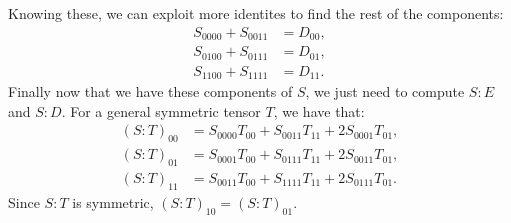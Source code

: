 \documentclass{article}
\begin{document}
Knowing these, we can exploit more identites to find the rest of the components:
\begin{subequations}
    \begin{align}
        S_{0000} + S_{0011} &= D_{00},  \\
        S_{0100} + S_{0111} &= D_{01},  \\
        S_{1100} + S_{1111} &= D_{11}.
    \end{align}
\end{subequations}
Finally now that we have these components of $S$, we just need to compute $S:E$ and $S:D$. For a general symmetric tensor $T$, we have that:
\begin{subequations}
    \begin{align}
        (S:T)_{00} &= S_{0000}T_{00} + S_{0011}T_{11} + 2S_{0001}T_{01},    \\
        (S:T)_{01} &= S_{0001}T_{00} + S_{0111}T_{11} + 2S_{0011}T_{01},    \\
        (S:T)_{11} &= S_{0011}T_{00} + S_{1111}T_{11} + 2S_{0111}T_{01}.
    \end{align}
\end{subequations}
Since $S:T$ is symmetric, $(S:T)_{10}=(S:T)_{01}$.
\end{document}
